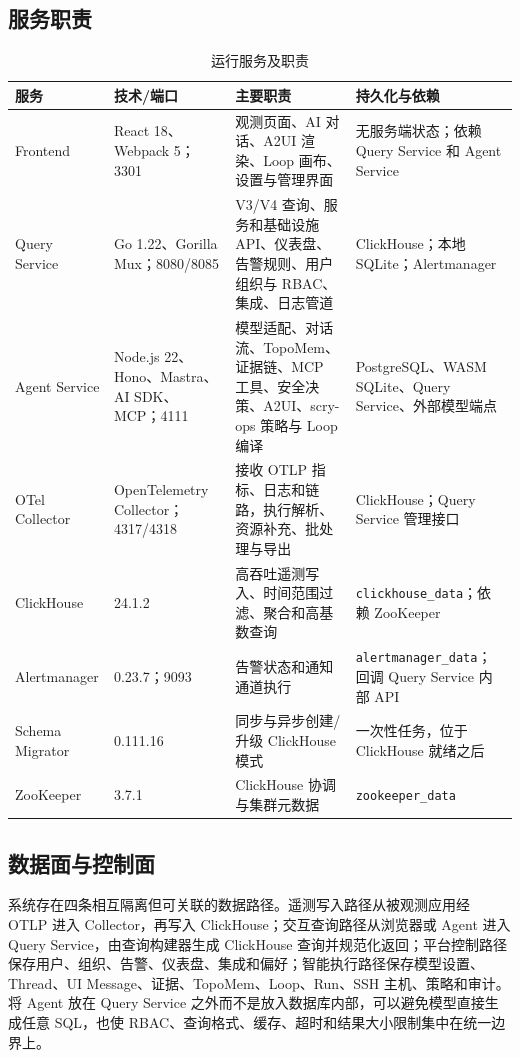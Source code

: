 \documentclass[conference,10pt]{IEEEtran}
\newcommand{\code}[1]{\texttt{#1}}
\begin{document}
\subsection{服务职责}

\begin{table}[t]
\caption{运行服务及职责}
\label{tab:services}
\centering
\small
\begin{tabularx}{\textwidth}{p{2.3cm}p{2.4cm}Y Y}
\toprule
\textbf{服务} & \textbf{技术/端口} & \textbf{主要职责} & \textbf{持久化与依赖} \\
\midrule
Frontend & React 18、Webpack 5；3301 & 观测页面、AI 对话、A2UI 渲染、Loop 画布、设置与管理界面 & 无服务端状态；依赖 Query Service 和 Agent Service \\
Query Service & Go 1.22、Gorilla Mux；8080/8085 & V3/V4 查询、服务和基础设施 API、仪表盘、告警规则、用户组织与 RBAC、集成、日志管道 & ClickHouse；本地 SQLite；Alertmanager \\
Agent Service & Node.js 22、Hono、Mastra、AI SDK、MCP；4111 & 模型适配、对话流、TopoMem、证据链、MCP 工具、安全决策、A2UI、scry-ops 策略与 Loop 编译 & PostgreSQL、WASM SQLite、Query Service、外部模型端点 \\
OTel Collector & OpenTelemetry Collector；4317/4318 & 接收 OTLP 指标、日志和链路，执行解析、资源补充、批处理与导出 & ClickHouse；Query Service 管理接口 \\
ClickHouse & 24.1.2 & 高吞吐遥测写入、时间范围过滤、聚合和高基数查询 & \code{clickhouse\_data}；依赖 ZooKeeper \\
Alertmanager & 0.23.7；9093 & 告警状态和通知通道执行 & \code{alertmanager\_data}；回调 Query Service 内部 API \\
Schema Migrator & 0.111.16 & 同步与异步创建/升级 ClickHouse 模式 & 一次性任务，位于 ClickHouse 就绪之后 \\
ZooKeeper & 3.7.1 & ClickHouse 协调与集群元数据 & \code{zookeeper\_data} \\
\bottomrule
\end{tabularx}
\end{table}

\subsection{数据面与控制面}

系统存在四条相互隔离但可关联的数据路径。遥测写入路径从被观测应用经 OTLP 进入 Collector，再写入 ClickHouse；交互查询路径从浏览器或 Agent 进入 Query Service，由查询构建器生成 ClickHouse 查询并规范化返回；平台控制路径保存用户、组织、告警、仪表盘、集成和偏好；智能执行路径保存模型设置、Thread、UI Message、证据、TopoMem、Loop、Run、SSH 主机、策略和审计。将 Agent 放在 Query Service 之外而不是放入数据库内部，可以避免模型直接生成任意 SQL，也使 RBAC、查询格式、缓存、超时和结果大小限制集中在统一边界上。
\end{document}
